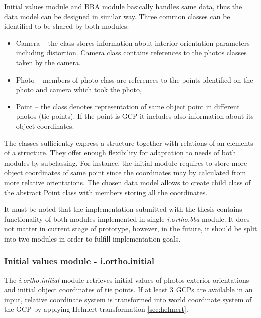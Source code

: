 \documentclass[a4paper,12pt]{article}
\newcommand{\term}[1]{%
{\it #1}%
}
\begin{document}
Initial values module and BBA module basically handles  same data, thus 
the data model can be designed in similar way. 
Three common classes can be identified to be shared by both modules:
\begin{itemize}
\item Camera -- the class stores information about interior orientation 
parameters including distortion. Camera class contains references to the photos
classes taken by the camera.
\item Photo -- members of photo class are references to the points identified 
	    on the photo and camera which took the photo,
\item Point -- the class denotes representation of same object point in different photos (tie points).
 If the point is GCP it includes also information about its object coordinates. 
\end{itemize}

The classes sufficiently express a structure together with relations of an elements of a structure.
They offer enough flexibility for adaptation to needs of both modules by subclassing. 
For instance, the initial module requires to store more object coordinates of same point 
since the coordinates may by calculated from more relative orientations. The chosen data model allows 
to create child class of the abstract Point class with members storing all the coordinates. 

It must be noted that the implementation submitted with the thesis contains functionality of both modules
implemented in single  \term{i.ortho.bba} module. 
It does not matter in current stage of prototype, however, in the future, it should be split into two modules 
in order to fulfill implementation goals.  

\subsubsection{Initial values module - i.ortho.initial}


The \term{i.ortho.initial} module retrieves initial values of photos exterior orientations and 
initial object coordinates of tie points. If at least 3 GCPs are 
available in an input, relative coordinate system
is transformed into world coordinate system of the GCP by applying Helmert transformation \ref{sec:helmert}. 

\end{document}
